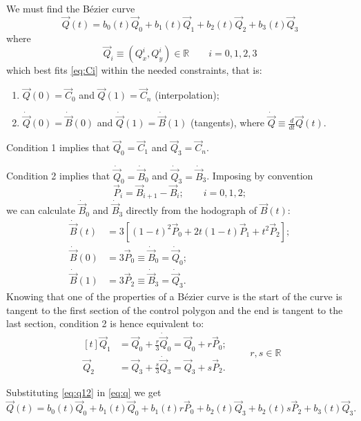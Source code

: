 \documentclass{scrartcl}
\newcommand\V[1]{\vec{#1}}
\newcommand\D[1]{\dot{#1}}
\newcommand\DV[1]{\D{\V{#1}}}
\begin{document}
We must find the Bézier curve
\begin{equation}\label{eq:q}
\V{Q}(t) = b_0(t) \V{Q}_0 + b_1(t) \V{Q}_1 + b_2(t) \V{Q}_2 + b_3(t) \V{Q}_3
\end{equation}
where
\begin{equation*}
\V{Q}_i \equiv ( Q^i_x, Q^i_y ) \in \mathbb{R} \qquad i = 0,1,2,3
\end{equation*}
which best fits \eqref{eq:Ci} within the needed constraints, that is:
\begin{enumerate}
\item $\V{Q}(0) = \V{C}_0$ and $\V{Q}(1) = \V{C}_n$ (interpolation);
\item $\DV{Q}(0) = \DV{B}(0)$ and $\DV{Q}(1) = \DV{B}(1)$ (tangents),
where $\DV{Q} \equiv \frac{d}{dt} \V{Q}(t)$.
\end{enumerate}

\medskip
Condition 1 implies that $\V{Q}_0 = \V{C}_1$ and $\V{Q}_3 = \V{C}_n$.

Condition 2 implies that $\DV{Q}_0 = \DV{B}_0$ and
$\DV{Q}_3 = \DV{B}_3$. Imposing by convention
\begin{equation}\label{eq:pi}
    \V{P}_i = \V{B}_{i+1} - \V{B}_i; \qquad i = 0, 1, 2;
\end{equation}
we can calculate $\DV{B}_0$ and $\DV{B}_3$ directly from the hodograph
of $\V{B}(t)$:
\begin{align*}
    \DV{B}(t) &= 3 \left[ (1-t)^2 \V{P}_0 + 2t(1-t) \V{P}_1 + t^2 \V{P}_2 \right]; \\
    \DV{B}(0) &= 3 \V{P}_0 \equiv \DV{B}_0 = \DV{Q}_0; \\
    \DV{B}(1) &= 3 \V{P}_2 \equiv \DV{B}_3 = \DV{Q}_3.
\end{align*}
Knowing that one of the properties of a Bézier curve is the start of the
curve is tangent to the first section of the control polygon and the end
is tangent to the last section, condition 2 is hence equivalent to:
\begin{equation}\label{eq:q12}
\begin{aligned}[t]
    \V{Q}_1 &= \V{Q}_0 + \frac{r}{3} \DV{Q}_0 = \V{Q}_0 + r \V{P}_0; \\
    \V{Q}_2 &= \V{Q}_3 + \frac{s}{3} \DV{Q}_3 = \V{Q}_3 + s \V{P}_2.
\end{aligned}
\qquad r, s \in \mathbb{R}
\end{equation}

Substituting \eqref{eq:q12} in \eqref{eq:q} we get
\begin{equation*}
\V{Q}(t) = b_0(t) \V{Q}_0 + b_1(t) \V{Q}_0 + b_1(t) r \V{P}_0 +
b_2(t) \V{Q}_3 + b_2(t) s \V{P}_2 + b_3(t) \V{Q}_3.
\end{equation*}
\end{document}
